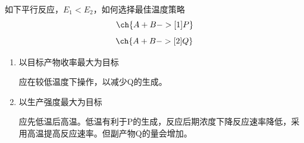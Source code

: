 \documentclass[dvipsnames, svgnames, x11names]{beamer}
\begin{document}
\begin{frame}[t]
    \frametitle{}
    \begin{question}
        如下平行反应，$E_1<E_2$，如何选择最佳温度策略
        \[
        \ch{A + B ->[1] P}
        \]
        \[
            \ch{A + B ->[2] Q}
        \]
        \tcblower
        \begin{enumerate}
            \item 以目标产物收率最大为目标
            
            应在较低温度下操作，以减少Q的生成。
            \item 以生产强度最大为目标
            
            应先低温后高温。低温有利于P的生成，反应后期浓度下降反应速率降低，采用高温提高反应速率。但副产物Q的量会增加。
        \end{enumerate}
    \end{question}
\end{frame}
\end{document}
